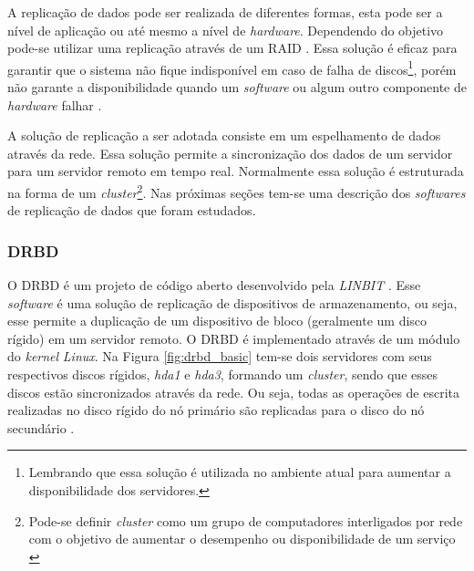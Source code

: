 A replicação de dados pode ser realizada de diferentes formas, esta pode ser a nível de aplicação ou até mesmo a nível de \textit{hardware}.
Dependendo do objetivo pode-se utilizar uma replicação através de um \ac{RAID} \cite{tanenbaum2009sistemas}. Essa solução é eficaz para garantir 
que o sistema não fique indisponível em caso de falha de discos\footnote[1]{Lembrando que essa solução é utilizada no ambiente atual para 
aumentar a disponibilidade dos servidores.}, porém não garante a disponibilidade quando um \textit{software} ou algum outro componente de 
\textit{hardware} falhar \cite{zaminhani2008}.

A solução de replicação a ser adotada consiste em um espelhamento de dados através da rede. Essa solução permite a sincronização dos dados de um 
servidor para um servidor remoto em tempo real. Normalmente essa solução é estruturada na forma de um \textit{cluster}\footnote[2]{Pode-se definir 
\textit{cluster} como um grupo de computadores interligados por rede com o objetivo de aumentar o desempenho ou disponibilidade de um serviço 
\cite{freitas2005}}.
Nas próximas seções tem-se uma descrição dos \textit{softwares} de replicação de dados que foram estudados.


\subsubsection{DRBD}
\label{section:drbd}
O \ac{DRBD} é um projeto de código aberto desenvolvido pela \textit{LINBIT} \cite{drbd}.
Esse \textit{software} é uma solução de replicação de dispositivos de armazenamento, ou seja, esse permite a duplicação de um dispositivo de bloco 
(geralmente um disco rígido) em um servidor remoto. O \ac{DRBD} é implementado através de um módulo do \textit{kernel} \textit{Linux}. 
Na Figura \ref{fig:drbd_basic} tem-se dois servidores com seus respectivos discos rígidos, \textit{hda1} e 
\textit{hda3}, formando um \textit{cluster}, sendo que esses discos estão sincronizados através da rede. Ou seja, todas as operações de escrita 
realizadas no disco rígido do nó primário são replicadas para o disco do nó secundário \cite{zaminhani2008}.

